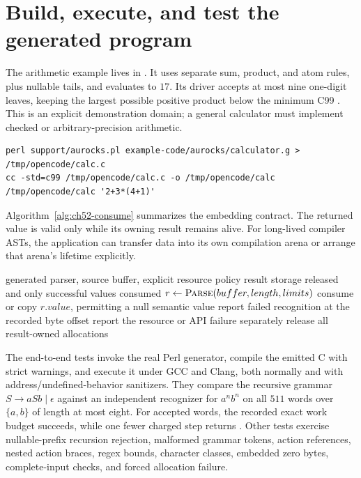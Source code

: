 \section{Build, execute, and test the generated program}
\label{sec:ch52-tests}

The arithmetic example lives in .
It uses separate sum, product, and atom rules, plus nullable tails, and evaluates  to $17$.
Its driver accepts at most nine one-digit leaves, keeping the largest possible positive product below the minimum C99 .
This is an explicit demonstration domain; a general calculator must implement checked or arbitrary-precision arithmetic.

\begin{verbatim}
perl support/aurocks.pl example-code/aurocks/calculator.g > /tmp/opencode/calc.c
cc -std=c99 /tmp/opencode/calc.c -o /tmp/opencode/calc
/tmp/opencode/calc '2+3*(4+1)'
\end{verbatim}

Algorithm~\ref{alg:ch52-consume} summarizes the embedding contract.
The returned value is valid only while its owning result remains alive.
For long-lived compiler ASTs, the application can transfer data into its own compilation arena or arrange that arena's lifetime explicitly.

\begin{algorithm}[htbp]
\caption{Consume a generated parser result without confusing failure categories.}
\label{alg:ch52-consume}
\begin{pseudocode}
\Require generated parser, source buffer, explicit resource policy
\Ensure result storage released and only successful values consumed
\State $r\gets\Call{Parse}{buffer,length,limits}$
  \State consume or copy $r.value$, permitting a null semantic value
  \State report failed recognition at the recorded byte offset
\Else
  \State report the resource or API failure separately
\EndIf
\State release all result-owned allocations
\end{pseudocode}
\end{algorithm}

The end-to-end tests invoke the real Perl generator, compile the emitted C with strict warnings, and execute it under GCC and Clang, both normally and with address/undefined-behavior sanitizers.
They compare the recursive grammar $S\to aSb\mid\epsilon$ against an independent recognizer for $a^n b^n$ on all $511$ words over $\{a,b\}$ of length at most eight.
For accepted words, the recorded exact work budget succeeds, while one fewer charged step returns .
Other tests exercise nullable-prefix recursion rejection, malformed grammar tokens, action references, nested action braces, regex bounds, character classes, embedded zero bytes, complete-input checks, and forced allocation failure.

